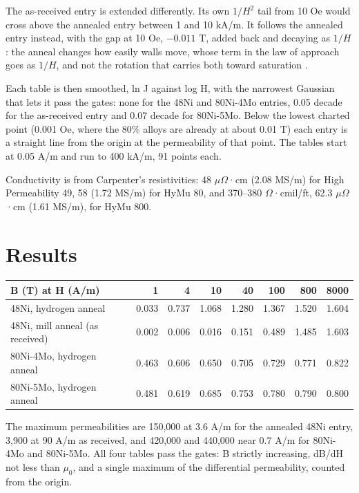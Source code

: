 \documentclass[
  11pt,
]{article}
\newcounter{none} %
\begin{document}
The as-received entry is extended differently. Its own \(1/H^{2}\) tail from 10 Oe would cross above the annealed entry between 1 and 10 kA/m. It follows the annealed entry instead, with the gap at 10 Oe, $-0.011$ T, added back and decaying as \(1/H\): the anneal changes how easily walls move, whose term in the law of approach goes as \(1/H\), and not the rotation that carries both toward saturation \cite{meeker-iron}.

Each table is then smoothed, ln J against log H, with the narrowest Gaussian that lets it pass the gates: none for the 48Ni and 80Ni-4Mo entries, 0.05 decade for the as-received entry and 0.07 decade for 80Ni-5Mo. Below the lowest charted point (0.001 Oe, where the 80\% alloys are already at about 0.01 T) each entry is a straight line from the origin at the permeability of that point. The tables start at 0.05 A/m and run to 400 kA/m, 91 points each.

Conductivity is from Carpenter's resistivities: 48 \(\mu\Omega\)·cm (2.08 MS/m) for High Permeability 49, 58 (1.72 MS/m) for HyMu 80, and 370--380 \(\Omega\)·cmil/ft, 62.3 \(\mu\Omega\)·cm (1.61 MS/m), for HyMu 800.

\section{Results}\label{results}

\begin{center}
\begin{tabular}{lrrrrrrr}
\toprule
B (T) at H (A/m) & 1 & 4 & 10 & 40 & 100 & 800 & 8000 \\
\midrule
48Ni, hydrogen anneal & 0.033 & 0.737 & 1.068 & 1.280 & 1.367 & 1.520 & 1.604 \\
48Ni, mill anneal (as received) & 0.002 & 0.006 & 0.016 & 0.151 & 0.489 & 1.485 & 1.603 \\
80Ni-4Mo, hydrogen anneal & 0.463 & 0.606 & 0.650 & 0.705 & 0.729 & 0.771 & 0.822 \\
80Ni-5Mo, hydrogen anneal & 0.481 & 0.619 & 0.685 & 0.753 & 0.780 & 0.790 & 0.800 \\
\bottomrule
\end{tabular}
\end{center}

The maximum permeabilities are 150,000 at 3.6 A/m for the annealed 48Ni entry, 3,900 at 90 A/m as received, and 420,000 and 440,000 near 0.7 A/m for 80Ni-4Mo and 80Ni-5Mo. All four tables pass the gates: B strictly increasing, dB/dH not less than \(\mu_0\), and a single maximum of the differential permeability, counted from the origin.
\end{document}
